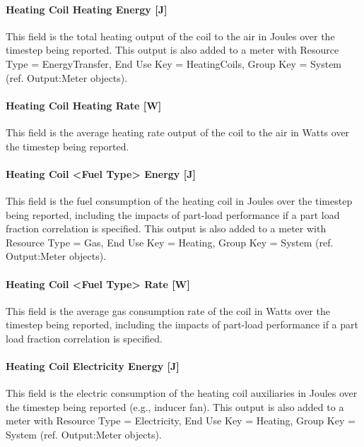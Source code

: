 \paragraph{Heating Coil Heating Energy {[}J{]}}\label{heating-coil-heating-energy-j-6}

This field is the total heating output of the coil to the air in Joules over the timestep being reported. This output is also added to a meter with Resource Type = EnergyTransfer, End Use Key = HeatingCoils, Group Key = System (ref. Output:Meter objects).

\paragraph{Heating Coil Heating Rate {[}W{]}}\label{heating-coil-heating-rate-w-6}

This field is the average heating rate output of the coil to the air in Watts over the timestep being reported.

\paragraph{Heating Coil <Fuel Type> Energy {[}J{]}}\label{heating-coil-gas-energy-j}

This field is the fuel consumption of the heating coil in Joules over the timestep being reported, including the impacts of part-load performance if a part load fraction correlation is specified. This output is also added to a meter with Resource Type = Gas, End Use Key = Heating, Group Key = System (ref. Output:Meter objects).

\paragraph{Heating Coil <Fuel Type> Rate {[}W{]}}\label{heating-coil-gas-rate-w}

This field is the average gas consumption rate of the coil in Watts over the timestep being reported, including the impacts of part-load performance if a part load fraction correlation is specified.

\paragraph{Heating Coil Electricity Energy {[}J{]}}\label{heating-coil-electric-energy-j-2}

This field is the electric consumption of the heating coil auxiliaries in Joules over the timestep being reported (e.g., inducer fan). This output is also added to a meter with Resource Type = Electricity, End Use Key = Heating, Group Key = System (ref. Output:Meter objects).

